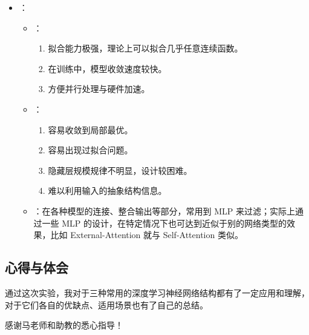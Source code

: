 \documentclass[a4paper]{article}
\begin{document}
\begin{itemize}
\begin{itemize}
        \end{itemize}
        \item {}：
        \begin{itemize}
            \item {}：
            \begin{enumerate}
                \item 拟合能力极强，理论上可以拟合几乎任意连续函数。
                \item 在训练中，模型收敛速度较快。
                \item 方便并行处理与硬件加速。
            \end{enumerate}
            \item {}：
            \begin{enumerate}
                \item 容易收敛到局部最优。
                \item 容易出现过拟合问题。
                \item 隐藏层规模规律不明显，设计较困难。
                \item 难以利用输入的抽象结构信息。
            \end{enumerate}
            \item {}：在各种模型的连接、整合输出等部分，常用到 MLP 来过滤；实际上通过一些 MLP 的设计，在特定情况下也可达到近似于别的网络类型的效果，比如 External-Attention 就与 Self-Attention 类似。
        \end{itemize}
    \end{itemize}

    \subsection{心得与体会}

    通过这次实验，我对于三种常用的深度学习神经网络结构都有了一定应用和理解，对于它们各自的优缺点、适用场景也有了自己的总结。

    感谢马老师和助教的悉心指导！
\end{document}
